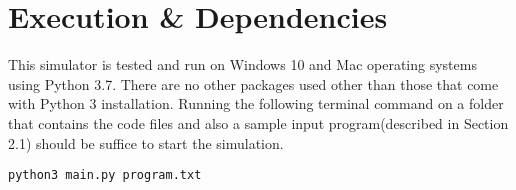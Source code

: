 \chapter{Execution \& Dependencies}
\noindent This simulator is tested and run on Windows 10 and Mac operating systems using Python 3.7. There are no other packages used other than those that come with Python 3 installation. Running the following terminal command on a folder that contains the code files and also a sample input program(described in Section 2.1) should be suffice to start the simulation.
\vspace{0.5 cm}

\begin{lstlisting}
python3 main.py program.txt
\end{lstlisting}